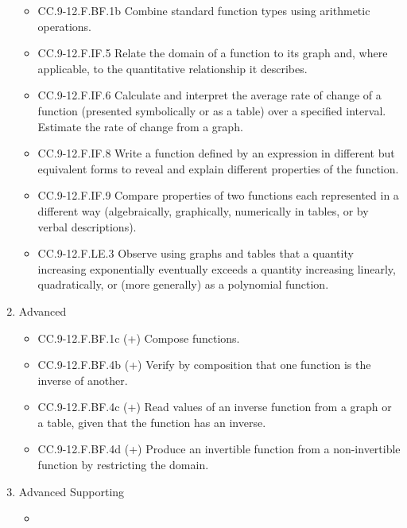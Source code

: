 \documentclass{article}
\begin{document}
\begin{enumerate}
\begin{itemize}
		\item CC.9-12.F.BF.1b Combine standard function types using arithmetic operations. 
		\item CC.9-12.F.IF.5  Relate the domain of a function to its graph and, where applicable, to the quantitative relationship it describes.
		\item CC.9-12.F.IF.6   Calculate and interpret the average rate of change of a function (presented symbolically or as a table) over a specified interval. Estimate the rate of change from a graph.
		\item CC.9-12.F.IF.8  Write a function defined by an expression in different but equivalent forms to reveal and explain different properties of the function. 
		\item CC.9-12.F.IF.9 Compare properties of two functions each represented in a different way (algebraically, graphically, numerically in tables, or by verbal descriptions).
		\item CC.9-12.F.LE.3  Observe using graphs and tables that a quantity increasing exponentially eventually exceeds a quantity increasing linearly, quadratically, or (more generally) as a polynomial function.
	\end{itemize}
	\item Advanced
	\begin{itemize}
		\item CC.9-12.F.BF.1c (+) Compose functions. 
		\item CC.9-12.F.BF.4b (+) Verify by composition that one function is the inverse of another. 
		\item CC.9-12.F.BF.4c (+) Read values of an inverse function from a graph or a table, given that the function has an inverse.
		\item CC.9-12.F.BF.4d (+) Produce an invertible function from a non-invertible function by restricting the domain.
	\end{itemize}
	\item Advanced Supporting
	\begin{itemize}
		\item
	\end{itemize}
\end{enumerate}
\newpage
\end{document}
